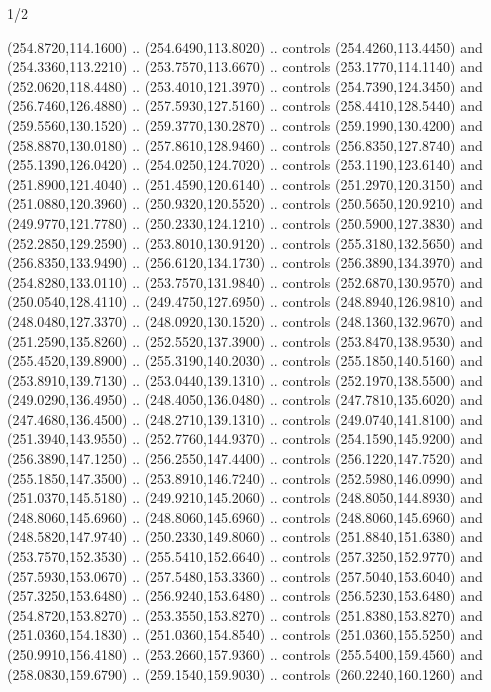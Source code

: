 \begin{flagdescription}{1/2}
\begin{scope}[xshift=0.5\flaglength]
\begin{scope}[scale=0.004\flagwidth,xshift=-90mm,yshift=89mm]
\begin{scope}[y=0.80pt, x=0.80pt, yscale=-1, xscale=1, inner sep=0pt, outer sep=0pt]
  (254.8720,114.1600) .. (254.6490,113.8020) .. controls (254.4260,113.4450) and
  (254.3360,113.2210) .. (253.7570,113.6670) .. controls (253.1770,114.1140) and
  (252.0620,118.4480) .. (253.4010,121.3970) .. controls (254.7390,124.3450) and
  (256.7460,126.4880) .. (257.5930,127.5160) .. controls (258.4410,128.5440) and
  (259.5560,130.1520) .. (259.3770,130.2870) .. controls (259.1990,130.4200) and
  (258.8870,130.0180) .. (257.8610,128.9460) .. controls (256.8350,127.8740) and
  (255.1390,126.0420) .. (254.0250,124.7020) .. controls (253.1190,123.6140) and
  (251.8900,121.4040) .. (251.4590,120.6140) .. controls (251.2970,120.3150) and
  (251.0880,120.3960) .. (250.9320,120.5520) .. controls (250.5650,120.9210) and
  (249.9770,121.7780) .. (250.2330,124.1210) .. controls (250.5900,127.3830) and
  (252.2850,129.2590) .. (253.8010,130.9120) .. controls (255.3180,132.5650) and
  (256.8350,133.9490) .. (256.6120,134.1730) .. controls (256.3890,134.3970) and
  (254.8280,133.0110) .. (253.7570,131.9840) .. controls (252.6870,130.9570) and
  (250.0540,128.4110) .. (249.4750,127.6950) .. controls (248.8940,126.9810) and
  (248.0480,127.3370) .. (248.0920,130.1520) .. controls (248.1360,132.9670) and
  (251.2590,135.8260) .. (252.5520,137.3900) .. controls (253.8470,138.9530) and
  (255.4520,139.8900) .. (255.3190,140.2030) .. controls (255.1850,140.5160) and
  (253.8910,139.7130) .. (253.0440,139.1310) .. controls (252.1970,138.5500) and
  (249.0290,136.4950) .. (248.4050,136.0480) .. controls (247.7810,135.6020) and
  (247.4680,136.4500) .. (248.2710,139.1310) .. controls (249.0740,141.8100) and
  (251.3940,143.9550) .. (252.7760,144.9370) .. controls (254.1590,145.9200) and
  (256.3890,147.1250) .. (256.2550,147.4400) .. controls (256.1220,147.7520) and
  (255.1850,147.3500) .. (253.8910,146.7240) .. controls (252.5980,146.0990) and
  (251.0370,145.5180) .. (249.9210,145.2060) .. controls (248.8050,144.8930) and
  (248.8060,145.6960) .. (248.8060,145.6960) .. controls (248.8060,145.6960) and
  (248.5820,147.9740) .. (250.2330,149.8060) .. controls (251.8840,151.6380) and
  (253.7570,152.3530) .. (255.5410,152.6640) .. controls (257.3250,152.9770) and
  (257.5930,153.0670) .. (257.5480,153.3360) .. controls (257.5040,153.6040) and
  (257.3250,153.6480) .. (256.9240,153.6480) .. controls (256.5230,153.6480) and
  (254.8720,153.8270) .. (253.3550,153.8270) .. controls (251.8380,153.8270) and
  (251.0360,154.1830) .. (251.0360,154.8540) .. controls (251.0360,155.5250) and
  (250.9910,156.4180) .. (253.2660,157.9360) .. controls (255.5400,159.4560) and
  (258.0830,159.6790) .. (259.1540,159.9030) .. controls (260.2240,160.1260) and

\end{scope}
\end{scope}
\end{scope}
\end{flagdescription}
